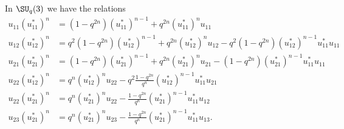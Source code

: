 \begin{lemma}       \label{Lemuijustijnstarnsubeqijuk}
    In \( \SU_q(3)\) we have the relations
    \begin{subequations}
        \begin{align}
            u_{11}(u_{11}^*)^n&=(1-q^{2n})(u_{11}^*)^{n-1}+q^{2n}(u_{11}^*)^nu_{11}     \label{subeqlemuijuklstarni}\\
            u_{12}(u_{12}^*)^n&=q^2(1-q^{2n})(u_{12}^*)^{n-1}+q^{2n}(u_{12}^*)^nu_{12}-q^2(1-q^{2n})(u_{12}^*)^{n-1}u_{11}^*u_{11}\\
            u_{21}(u_{21}^*)^n&=(1-q^{2n})(u_{21}^*)^{n-1}+q^{2n}(u_{21}^*)^nu_{21}-(1-q^{2n})(u_{21}^*)^{n-1}u_{11}^*u_{11}\\
            u_{22}(u_{12}^*)^n&=q^n(u_{12}^*)^nu_{22}-q^2\frac{ 1-q^{2n} }{ q^n }(u_{12}^*)^{n-1}u_{11}^*u_{21}     \label{subeqlemuijuklstarnivd}\\
            u_{22}(u_{21}^*)^n&=q^n(u_{21}^*)^nu_{22}-\frac{ 1-q^{2n} }{ q^n }(u_{21}^*)^{n-1}u_{11}^*u_{12}\\
            u_{23}(u_{21}^*)^n&=q^n(u_{21}^*)^nu_{23}-\frac{ 1-q^{2n} }{ q^n }(u_{21}^*)^{n-1}u_{11}^*u_{13}.
        \end{align}
    \end{subequations}
    
\end{lemma}

